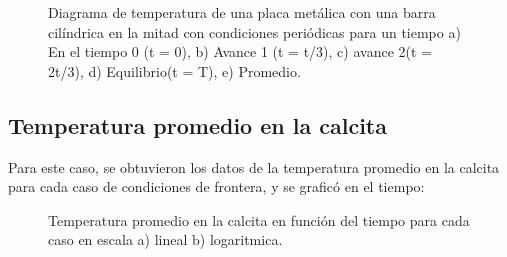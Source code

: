 \documentclass{article}
\begin{document}
\begin{figure}[H]
    \caption{Diagrama de temperatura de una placa metálica con una barra cilíndrica en la mitad con condiciones periódicas para un tiempo a) En el tiempo 0 (t = 0), b) Avance 1 (t = t/3), c) avance 2(t = 2t/3), d) Equilibrio(t = T), e) Promedio.}
    \label{fig:CondicionesFijasTemp}
\end{figure}

\subsection*{Temperatura promedio en la calcita}
Para este caso, se obtuvieron los datos de la temperatura promedio en la calcita para cada caso de condiciones de frontera, y se graficó en el tiempo:

\begin{figure}[H]
    \centering
    \caption{Temperatura promedio en la calcita en función del tiempo para cada caso en escala a) lineal b) logaritmica.}
    \label{fig:CondicionesFijasTemp}
\end{figure}
\end{document}

